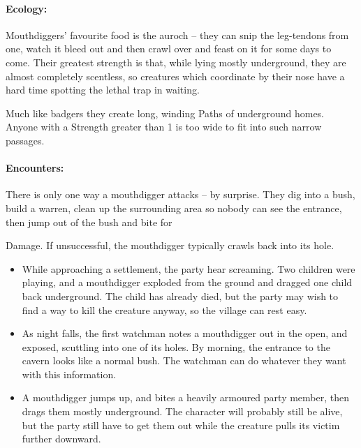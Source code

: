 \begin{multicols}{2}
\paragraph{Ecology:} Mouthdiggers' favourite food is the auroch -- they can snip the leg-tendons from one, watch it bleed out and then crawl over and feast on it for some days to come.
Their greatest strength is that, while lying mostly underground, they are almost completely scentless, so creatures which coordinate by their nose have a hard time spotting the lethal trap in waiting.

Much like badgers they create long, winding Paths of underground homes.  Anyone with a Strength greater than 1 is too wide to fit into such narrow passages.

\paragraph{Encounters:} There is only one way a mouthdigger attacks -- by surprise.  They dig into a bush, build a warren, clean up the surrounding area so nobody can see the entrance, then jump out of the bush and bite for \addtocounter{strb}{-5} Damage.  If unsuccessful, the mouthdigger typically crawls back into its hole.

\begin{itemize}

  \item
  While approaching a settlement, the party hear screaming.
  Two children were playing, and a mouthdigger exploded from the ground and dragged one child back underground.
  The child has already died, but the party may wish to find a way to kill the creature anyway, so the village can rest easy.
  \item
  As night falls, the first watchman notes a mouthdigger out in the open, and exposed, scuttling into one of its holes.
  By morning, the entrance to the cavern looks like a normal bush.
  The watchman can do whatever they want with this information.
  \item
  A mouthdigger jumps up, and bites a heavily armoured party member, then drags them mostly underground.
  The character will probably still be alive, but the party still have to get them out while the creature pulls its victim further downward.

\end{itemize}

\mouthdigger

\label{wolf}


\end{multicols}

